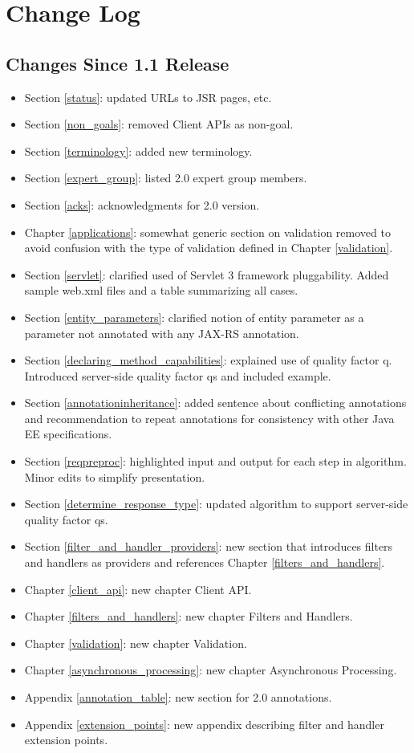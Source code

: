\chapter{Change Log}


\section{Changes Since 1.1 Release}

\begin{itemize}
\item Section \ref{status}: updated URLs to JSR pages, etc.
\item Section \ref{non_goals}: removed Client APIs as non-goal.
\item Section \ref{terminology}: added new terminology.
\item Section \ref{expert_group}: listed 2.0 expert group members.
\item Section \ref{acks}: acknowledgments for 2.0 version.
\item Chapter \ref{applications}: somewhat generic section on validation removed to avoid confusion with the type of validation defined in Chapter \ref{validation}.
\item Section \ref{servlet}: clarified used of Servlet 3 framework pluggability. Added sample web.xml files and a table summarizing all cases.
\item Section \ref{entity_parameters}: clarified notion of entity parameter as a parameter not annotated with any JAX-RS annotation.
\item Section \ref{declaring_method_capabilities}: explained use of quality factor q. Introduced server-side quality factor qs and included example.
\item Section \ref{annotationinheritance}: added sentence about conflicting annotations and recommendation to repeat annotations for consistency with other Java EE specifications.
\item Section \ref{reqpreproc}: highlighted input and output for each step in algorithm. Minor edits to simplify presentation.
\item Section \ref{determine_response_type}: updated algorithm to support server-side quality factor qs.
\item Section \ref{filter_and_handler_providers}: new section that introduces filters and handlers as providers and references Chapter \ref{filters_and_handlers}.
\item Chapter \ref{client_api}: new chapter Client API.
\item Chapter \ref{filters_and_handlers}: new chapter Filters and Handlers.
\item Chapter \ref{validation}: new chapter Validation.
\item Chapter \ref{asynchronous_processing}: new chapter Asynchronous Processing.
\item Appendix \ref{annotation_table}: new section for 2.0 annotations.
\item Appendix \ref{extension_points}: new appendix describing filter and handler extension points.
\end{itemize}

